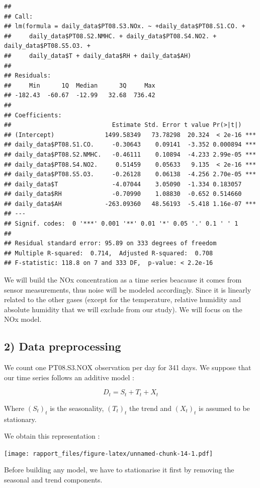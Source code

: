 \documentclass[]{article}
\begin{document}
\begin{verbatim}
## 
## Call:
## lm(formula = daily_data$PT08.S3.NOx. ~ +daily_data$PT08.S1.CO. + 
##     daily_data$PT08.S2.NMHC. + daily_data$PT08.S4.NO2. + daily_data$PT08.S5.O3. + 
##     daily_data$T + daily_data$RH + daily_data$AH)
## 
## Residuals:
##     Min      1Q  Median      3Q     Max 
## -182.43  -60.67  -12.99   32.68  736.42 
## 
## Coefficients:
##                            Estimate Std. Error t value Pr(>|t|)    
## (Intercept)              1499.58349   73.78298  20.324  < 2e-16 ***
## daily_data$PT08.S1.CO.     -0.30643    0.09141  -3.352 0.000894 ***
## daily_data$PT08.S2.NMHC.   -0.46111    0.10894  -4.233 2.99e-05 ***
## daily_data$PT08.S4.NO2.     0.51459    0.05633   9.135  < 2e-16 ***
## daily_data$PT08.S5.O3.     -0.26128    0.06138  -4.256 2.70e-05 ***
## daily_data$T               -4.07044    3.05090  -1.334 0.183057    
## daily_data$RH              -0.70990    1.08830  -0.652 0.514660    
## daily_data$AH            -263.09360   48.56193  -5.418 1.16e-07 ***
## ---
## Signif. codes:  0 '***' 0.001 '**' 0.01 '*' 0.05 '.' 0.1 ' ' 1
## 
## Residual standard error: 95.89 on 333 degrees of freedom
## Multiple R-squared:  0.714,  Adjusted R-squared:  0.708 
## F-statistic: 118.8 on 7 and 333 DF,  p-value: < 2.2e-16
\end{verbatim}

We will build the NOx concentration as a time series beacause it comes
from sensor measurements, thus noise will be modeled accordingly. Since
it is linearly related to the other gases (except for the temperature,
relative humidity and absolute humidity that we will exclude from our
study). We will focus on the NOx model.

\subsection{2) Data preprocessing}

We count one PT08.S3.NOX observation per day for 341 days. We suppose
that our time series follows an additive model :

\[
D_t = S_t + T_t +  X_t 
\]

Where \((S_t)_t\) is the seasonality, \((T_t)_t\) the trend and
\((X_t)_t\) is assumed to be stationary.

We obtain this representation :

\texttt{[image: rapport\_files/figure-latex/unnamed-chunk-14-1.pdf]}

Before building any model, we have to stationarise it first by removing
the seasonal and trend components.
\end{document}
